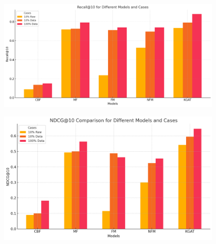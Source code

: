 \begin{figure}
    \centering
    \includegraphics[width=1\linewidth]{figures/recall_epoch.png}
\end{figure}
\begin{figure}
    \centering
    \includegraphics[width=1\linewidth]{figures/ndcg_epoch.png}
\end{figure}
